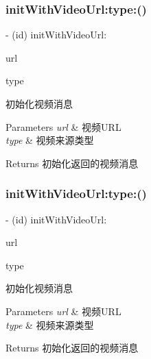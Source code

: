 \subsubsection{\texorpdfstring{init\+With\+Video\+Url\+:type\+:()}{initWithVideoUrl:type:()}\hspace{0.1cm}{\footnotesize\ttfamily [1/2]}}
{\footnotesize\ttfamily -\/ (id) init\+With\+Video\+Url\+: \begin{DoxyParamCaption}\item[{(N\+S\+String $\ast$)}]{url }\item[{type:(Tencent\+Api\+Video\+Source\+Type)}]{type }\end{DoxyParamCaption}}

初始化视频消息 
\begin{DoxyParams}{Parameters}
{\em url} & 视频\+U\+RL \\
\hline
{\em type} & 视频来源类型 \\
\hline
\end{DoxyParams}
\begin{DoxyReturn}{Returns}
初始化返回的视频消息 
\end{DoxyReturn}
\mbox{\label{interface_tencent_video_message_v1_a3d00c22af12e872979ab6155985e93ca}} 
\subsubsection{\texorpdfstring{init\+With\+Video\+Url\+:type\+:()}{initWithVideoUrl:type:()}\hspace{0.1cm}{\footnotesize\ttfamily [2/2]}}
{\footnotesize\ttfamily -\/ (id) init\+With\+Video\+Url\+: \begin{DoxyParamCaption}\item[{(N\+S\+String $\ast$)}]{url }\item[{type:(Tencent\+Api\+Video\+Source\+Type)}]{type }\end{DoxyParamCaption}}

初始化视频消息 
\begin{DoxyParams}{Parameters}
{\em url} & 视频\+U\+RL \\
\hline
{\em type} & 视频来源类型 \\
\hline
\end{DoxyParams}
\begin{DoxyReturn}{Returns}
初始化返回的视频消息 
\end{DoxyReturn}


